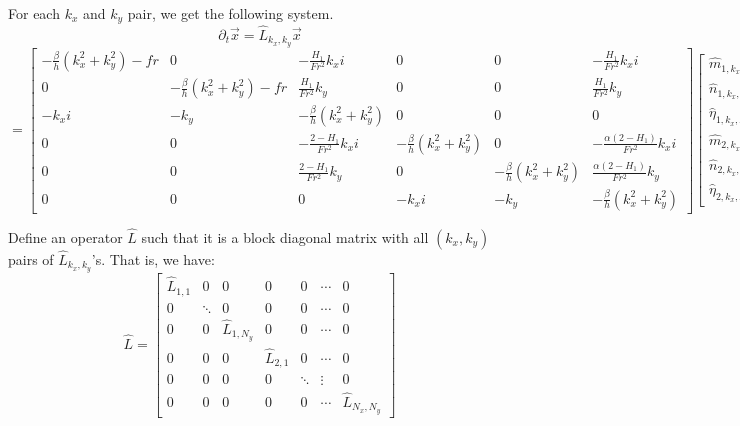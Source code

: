 \documentclass[10pt]{article}
\newcommand{\pd}[1]{\partial_{#1}}
\begin{document}
For each $k_x$ and $k_y$ pair, we get the following system.
\[\pd{t}\vec{x} = \hat{L}_{k_x,k_y}\vec{x} 
\]
\[=
\left[\begin{array}{ccc|ccc}
-\frac{\beta}{h}(k_x^2+k_y^2)-fr & 0 & -\frac{H_1}{Fr^2}k_xi & 0 & 0 & -\frac{H_1}{Fr^2}k_xi \\
0 & -\frac{\beta}{h}(k_x^2+k_y^2)-fr & \frac{H_1}{Fr^2}k_y & 0 & 0 & \frac{H_1}{Fr^2}k_y\\
-k_xi & -k_y & -\frac{\beta}{h}(k_x^2+k_y^2) & 0 & 0 & 0 \\ \hline
0 & 0 & -\frac{2-H_1}{Fr^2}k_xi & -\frac{\beta}{h}(k_x^2+k_y^2) & 0 &  -\frac{\alpha(2-H_1)}{Fr^2}k_xi \\
0 & 0 & \frac{2-H_1}{Fr^2}k_y & 0  & -\frac{\beta}{h}(k_x^2+k_y^2) &  \frac{\alpha(2-H_1)}{Fr^2}k_y \\
0 & 0 & 0 & -k_xi & -k_y & -\frac{\beta}{h}(k_x^2+k_y^2)
\end{array}\right] \begin{bmatrix}
\hat{m}_{1,k_x,k_y}\\
\hat{n}_{1,k_x,k_y}\\
\hat{\eta}_{1,k_x,k_y}\\
\hat{m}_{2,k_x,k_y}\\
\hat{n}_{2,k_x,k_y}\\
\hat{\eta}_{2,k_x,k_y}
\end{bmatrix} 
\]

Define an operator $\hat{L}$ such that it is a block diagonal matrix with all $(k_x, k_y)$ pairs of $\hat{L}_{k_x,k_y}$'s.
That is, we have:
\[
\hat{L} = \begin{bmatrix}
\hat{L}_{1,1} & 0 & 0 & 0 & 0 & \cdots & 0 \\
0 & \ddots & 0 & 0 & 0 & \cdots& 0 \\
0 & 0 & \hat{L}_{1, N_y}  & 0 & 0 & \cdots & 0\\
0 & 0 & 0 & \hat{L}_{2,1}  & 0 & \cdots & 0\\
0 & 0 & 0 & 0 & \ddots  & \vdots& 0\\
0 & 0 & 0 & 0 & 0 & \cdots& \hat{L}_{N_x,N_y}
\end{bmatrix}\]
\end{document}
